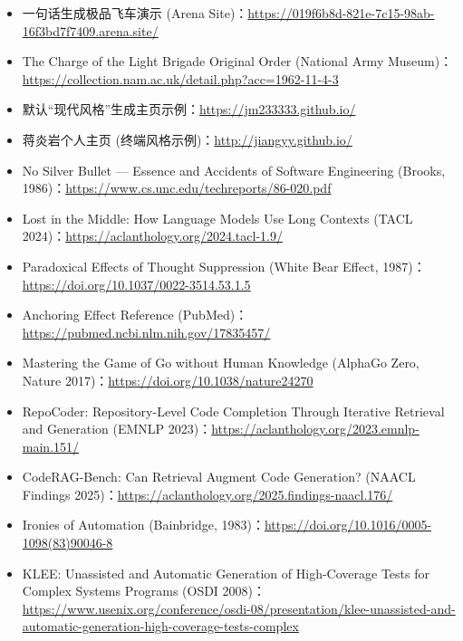\documentclass[UTF8,a4paper,11pt,fontset=fandol]{ctexart}
\begin{document}
\begin{itemize}
\item 一句话生成极品飞车演示 (Arena Site)：\url{https://019f6b8d-821e-7c15-98ab-16f3bd7f7409.arena.site/}

\item The Charge of the Light Brigade Original Order (National Army Museum)：\url{https://collection.nam.ac.uk/detail.php?acc=1962-11-4-3}

\item 默认“现代风格”生成主页示例：\url{https://jm233333.github.io/}

\item 蒋炎岩个人主页 (终端风格示例)：\url{http://jiangyy.github.io/}

\item No Silver Bullet — Essence and Accidents of Software Engineering (Brooks, 1986)：\url{https://www.cs.unc.edu/techreports/86-020.pdf}

\item Lost in the Middle: How Language Models Use Long Contexts (TACL 2024)：\url{https://aclanthology.org/2024.tacl-1.9/}

\item Paradoxical Effects of Thought Suppression (White Bear Effect, 1987)：\url{https://doi.org/10.1037/0022-3514.53.1.5}

\item Anchoring Effect Reference (PubMed)：\url{https://pubmed.ncbi.nlm.nih.gov/17835457/}

\item Mastering the Game of Go without Human Knowledge (AlphaGo Zero, Nature 2017)：\url{https://doi.org/10.1038/nature24270}

\item RepoCoder: Repository-Level Code Completion Through Iterative Retrieval and Generation (EMNLP 2023)：\url{https://aclanthology.org/2023.emnlp-main.151/}

\item CodeRAG-Bench: Can Retrieval Augment Code Generation? (NAACL Findings 2025)：\url{https://aclanthology.org/2025.findings-naacl.176/}

\item Ironies of Automation (Bainbridge, 1983)：\url{https://doi.org/10.1016/0005-1098(83)90046-8}

\item KLEE: Unassisted and Automatic Generation of High-Coverage Tests for Complex Systems Programs (OSDI 2008)：\url{https://www.usenix.org/conference/osdi-08/presentation/klee-unassisted-and-automatic-generation-high-coverage-tests-complex}


\end{itemize}
\end{document}
